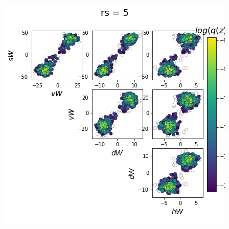 \documentclass[11pt]{article}
\begin{document}
\begin{center}
\includegraphics[scale=0.33]{figs/Z_SC_reduced_c=15_p=50_rs=5.png}
\end{center}
\end{document}
